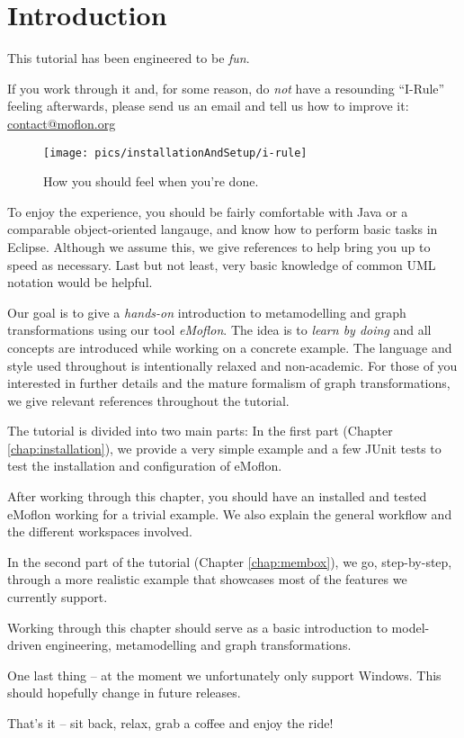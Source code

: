 \chapter{Introduction}
\label{chap:introduction}

This tutorial has been engineered to be \emph{fun}.

If you work through it and, for some reason, do \emph{not} have a resounding
``I-Rule'' feeling afterwards, please send us an email and tell us how to improve it:
\url{contact@moflon.org}

\begin{figure}[htp]
\begin{center}
  \texttt{[image: pics/installationAndSetup/i-rule]}
  \caption{How you should feel when you're done.}
  \label{i-rule}
\end{center}
\end{figure}

\newpage 

To enjoy the experience, you should be fairly comfortable with Java or
a comparable object-oriented langauge, and know how to perform basic tasks
in Eclipse.  Although we assume this, we give references to help bring you up to
speed as necessary.  Last but not least, very basic knowledge of
common UML notation would be helpful.

Our goal is to give a \emph{hands-on} introduction to metamodelling and graph
transformations using our tool \emph{eMoflon}.
The idea is to \emph{learn by doing} and all concepts are introduced while
working on a concrete example.
The language and style used throughout is intentionally relaxed and
non-academic.
For those of you interested in further details and the mature
formalism of graph transformations, we give relevant references throughout the
tutorial.

The tutorial is divided into two main parts:  In the first part (Chapter
\ref{chap:installation}), we provide a very simple example and a few JUnit tests
to test the installation and configuration of eMoflon.

After working through this chapter, you should have an installed
and tested eMoflon working for a trivial example.
We also explain the general workflow and the different workspaces involved.

In the second part of the tutorial (Chapter \ref{chap:membox}), we go,
step-by-step, through a more realistic example that showcases most of the
features we currently support.

Working through this chapter should serve as a basic introduction to
model-driven engineering, metamodelling and graph
transformations.

One last thing -- at the moment we unfortunately only support Windows.
This should hopefully change in future releases.

That's it -- sit back, relax, grab a coffee and enjoy the ride!


